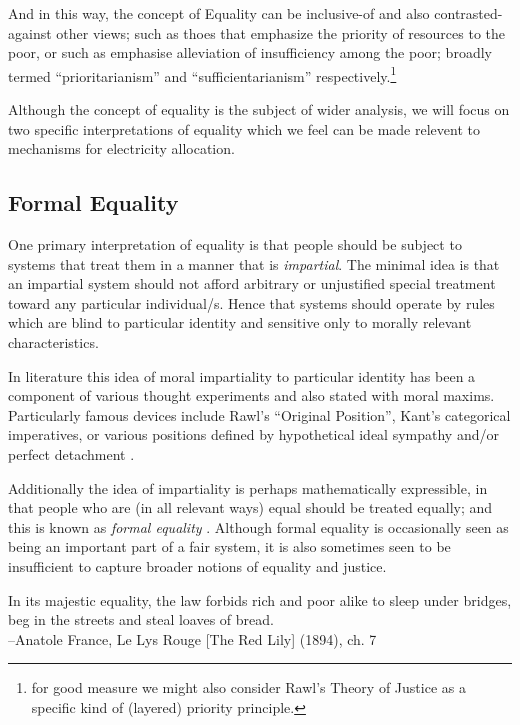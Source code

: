 And in this way, the concept of Equality can be inclusive-of and also contrasted-against other views; such as thoes that emphasize the priority of resources to the poor, or such as emphasise alleviation of insufficiency among the poor; broadly termed ``prioritarianism'' and ``sufficientarianism'' respectively.\cite{sep-egalitarianism}\footnote{for good measure we might also consider Rawl's Theory of Justice \cite{rawls2005theory} as a specific kind of (layered) priority principle.}

Although the concept of equality is the subject of wider analysis, we will focus on two specific interpretations of equality which we feel can be made relevent to mechanisms for electricity allocation.

\subsection{Formal Equality}\label{sec:formal_equality}

One primary interpretation of equality is that people should be subject to systems that treat them in a manner that is \textit{impartial}. The minimal idea is that an impartial system should not afford arbitrary or unjustified special treatment toward any particular individual/s. Hence that systems should operate by rules which are blind to particular identity and sensitive only to morally relevant characteristics.

In literature this idea of moral impartiality to particular identity has been a component of various thought experiments and also stated with moral maxims.
Particularly famous devices include Rawl's ``Original Position'', Kant's categorical imperatives, or various positions defined by hypothetical ideal sympathy and/or perfect detachment \cite{smithGutenberg, nla.cat-vn197822,10.2307/2103988}.

Additionally the idea of impartiality is perhaps mathematically expressible, in that people who are (in all relevant ways) equal should be treated equally; and this is known as \textit{formal equality} \cite{whatisbasicequalitynathan}. Although formal equality is occasionally seen as being an important part of a fair system, it is also sometimes seen to be insufficient to capture broader notions of equality and justice.

\begin{displayquote}
In its majestic equality, the law forbids rich and poor alike to sleep under bridges, beg in the streets and steal loaves of bread.\\
--Anatole France, Le Lys Rouge [The Red Lily] (1894), ch. 7
\end{displayquote}

